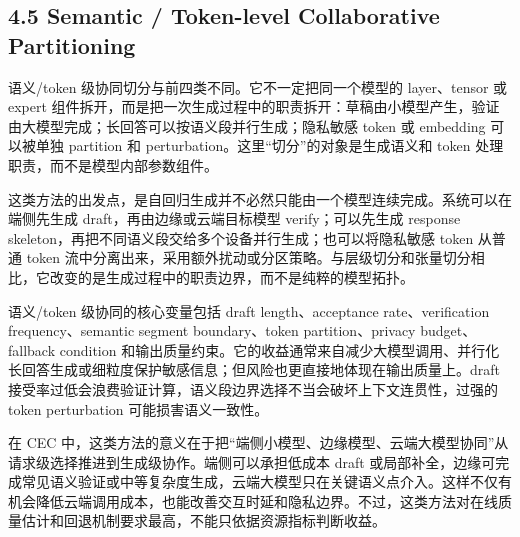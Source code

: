 \documentclass[a4paper,twocolumn,10pt]{ctexart}
\begin{document}
\subsection{4.5 Semantic / Token-level Collaborative Partitioning}

语义/token 级协同切分与前四类不同。它不一定把同一个模型的 layer、tensor 或 expert 组件拆开，而是把一次生成过程中的职责拆开：草稿由小模型产生，验证由大模型完成；长回答可以按语义段并行生成；隐私敏感 token 或 embedding 可以被单独 partition 和 perturbation。这里“切分”的对象是生成语义和 token 处理职责，而不是模型内部参数组件。


这类方法的出发点，是自回归生成并不必然只能由一个模型连续完成。系统可以在端侧先生成 draft，再由边缘或云端目标模型 verify；可以先生成 response skeleton，再把不同语义段交给多个设备并行生成；也可以将隐私敏感 token 从普通 token 流中分离出来，采用额外扰动或分区策略。与层级切分和张量切分相比，它改变的是生成过程中的职责边界，而不是纯粹的模型拓扑。


语义/token 级协同的核心变量包括 draft length、acceptance rate、verification frequency、semantic segment boundary、token partition、privacy budget、fallback condition 和输出质量约束。它的收益通常来自减少大模型调用、并行化长回答生成或细粒度保护敏感信息；但风险也更直接地体现在输出质量上。draft 接受率过低会浪费验证计算，语义段边界选择不当会破坏上下文连贯性，过强的 token perturbation 可能损害语义一致性。


在 CEC 中，这类方法的意义在于把“端侧小模型、边缘模型、云端大模型协同”从请求级选择推进到生成级协作。端侧可以承担低成本 draft 或局部补全，边缘可完成常见语义验证或中等复杂度生成，云端大模型只在关键语义点介入。这样不仅有机会降低云端调用成本，也能改善交互时延和隐私边界。不过，这类方法对在线质量估计和回退机制要求最高，不能只依据资源指标判断收益。
\end{document}
